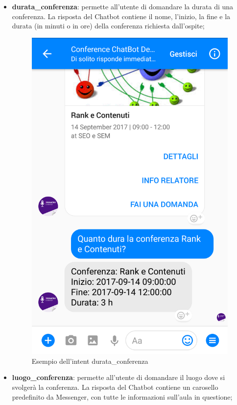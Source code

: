 \begin{itemize}
	\item \textbf{durata\_conferenza}: permette all'utente di domandare la durata di una conferenza. La risposta del \gls{Chatbot} contiene il nome, l'inizio, la fine e la durata (in minuti o in ore) della conferenza richiesta dall'ospite;
	\begin{figure}[h]
		\centering
		\includegraphics[scale=0.16]{../Immagini/durata.png}
		\caption{Esempio dell'intent durata\_conferenza}
	\end{figure}
\newpage
	\item \textbf{luogo\_conferenza}: permette all'utente di domandare il luogo dove si svolgerà la conferenza. La risposta del \gls{Chatbot} contiene un carosello predefinito da Messenger, con tutte le informazioni sull'aula in questione;

\end{itemize}
